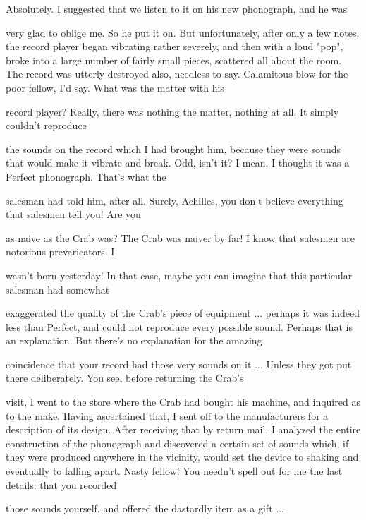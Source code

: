 \tortoise Absolutely. I suggested that we listen to it on his new phonograph, and he was\par
very glad to oblige me. So he put it on. But unfortunately, after only a few notes, the record player began vibrating rather severely, and then with a loud "pop", broke into a large number of fairly small pieces, scattered all about the room. The record was utterly destroyed also, needless to say. 
\achilles Calamitous blow for the poor fellow, I'd say. What was the matter with his\par
record player? 
\tortoise Really, there was nothing the matter, nothing at all. It simply couldn't reproduce\par
the sounds on the record which I had brought him, because they were sounds that would make it vibrate and break. 
\achilles Odd, isn't it? I mean, I thought it was a Perfect phonograph. That's what the\par
salesman had told him, after all. 
\tortoise Surely, Achilles, you don't believe everything that salesmen tell you! Are you\par
as naive as the Crab was? 
\achilles The Crab was naiver by far! I know that salesmen are notorious prevaricators. I\par
wasn't born yesterday! 
\tortoise In that case, maybe you can imagine that this particular salesman had somewhat\par
exaggerated the quality of the Crab's piece of equipment ... perhaps it was indeed less than Perfect, and could not reproduce every possible sound. 
\achilles Perhaps that is an explanation. But there's no explanation for the amazing\par
coincidence that your record had those very sounds on it ... 
\tortoise Unless they got put there deliberately. You see, before returning the Crab's\par
visit, I went to the store where the Crab had bought his machine, and inquired as to the make. Having ascertained that, I sent off to the manufacturers for a description of its design. After receiving that by return mail, I analyzed the entire construction of the phonograph and discovered a certain set of sounds which, if they were produced anywhere in the vicinity, would set the device to shaking and eventually to falling apart. 
\achilles Nasty fellow! You needn't spell out for me the last details: that you recorded\par
those sounds yourself, and offered the dastardly item as a gift ... 








